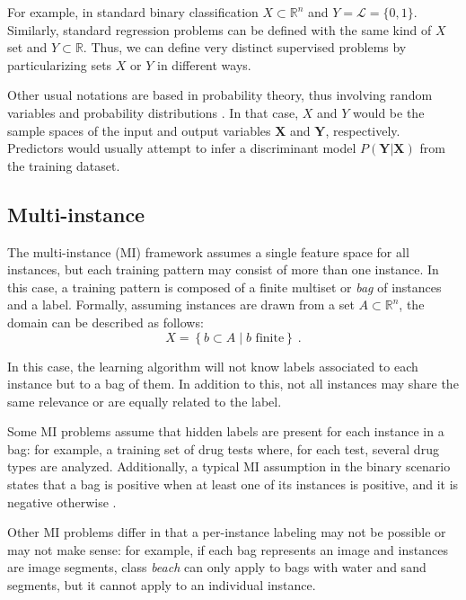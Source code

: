 For example, in standard binary classification $X\subset\mathbb R^n$ and $Y=\mathcal L=\{0, 1\}$. Similarly, standard regression problems can be defined with the same kind of $X$ set and $Y\subset \mathbb R$. Thus, we can define very distinct supervised problems by particularizing sets $X$ or $Y$ in different ways.

Other usual notations are based in probability theory, thus involving random variables and probability distributions . In that case, $X$ and $Y$ would be the sample spaces of the input and output variables $\mathbf X$ and $\mathbf Y$, respectively. Predictors would usually attempt to infer a discriminant model $P(\mathbf Y|\mathbf X)$ from the training dataset.

\subsection{Multi-instance}
\label{p3sec:minstance}

The multi-instance (MI) framework  assumes a single feature space for all instances, but each training pattern may consist of more than one instance. In this case, a training pattern is composed of a finite multiset or \emph{bag} of instances and a label. Formally, assuming instances are drawn from a set $A\subset\mathbb R^n$, the domain can be described as follows:
\begin{equation}
  X=\left\{b\subset A\mid b \mbox{ finite}\right\}~.
  \end{equation} 

In this case, the learning algorithm will not know labels associated to each instance but to a bag of them. In addition to this, not all instances may share the same relevance or are equally related to the label.

Some MI problems assume that hidden labels are present for each instance in a bag: for example, a training set of drug tests where, for each test, several drug types are analyzed. Additionally, a typical MI assumption in the binary scenario states that a bag is positive when at least one of its instances is positive, and it is negative otherwise .

Other MI problems differ in that a per-instance labeling may not be possible or may not make sense: for example, if each bag represents an image and instances are image segments, class \emph{beach} can only apply to bags with water and sand segments, but it cannot apply to an individual instance.


